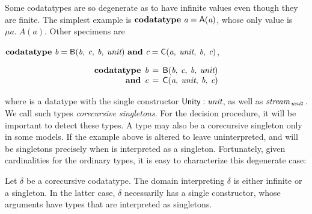 
Some codatatypes are so degenerate as to have infinite values
even though they are finite. The simplest example is
\vthinspace$\textbf{codatatype}~\textit{a} = \textsf{A}(\textit{a})$, whose
only value is $\mu a.\; A(a)$. Other specimens are
\begin{paper}%
\vthinspace$\textbf{codatatype}~\textit{b} = \textsf{B}(\textit{b},\: \textit{c},\: \textit{b},\: \textit{unit})
~\textbf{and}~ \textit{c} = \textsf{C}(\textit{a},\: \textit{unit},\: \textit{b},\: \textit{c})$,
\end{paper}%
\begin{report}%
\[\begin{aligned}[t]
      \textbf{codatatype}\;\, \textit{b} & \,=\, \textsf{B}(\textit{b},\: \textit{c},\: \textit{b},\: \textit{unit}) \\[-1\jot]
      \textbf{and}\;\, \textit{c} & \,=\, \textsf{C}(\textit{a},\: \textit{unit},\: \textit{b},\: \textit{c})
\end{aligned}
\]
\end{report}
where  is a datatype with the single constructor $\textsf{Unity} :
\textit{unit}$, as well as $\textit{stream}_{\,\textit{unit}\,}$. We call such types
\emph{corecursive singletons}. For the decision procedure, it will be
important to detect these types. %
A type may also be a corecursive singleton only in some models. If the example
above is altered to leave  uninterpreted,  and  will be
singletons precisely when  is interpreted as a singleton.
Fortunately, given cardinalities for the ordinary types, it is easy to
characterize this degenerate case:


\begin{lemma}%
\label{lem:corecursive-singletons}%
\afterDot
Let $\delta$ be a corecursive codatatype. The domain interpreting $\delta$ is
either infinite or a singleton. In the latter case, $\delta$ necessarily has a
single constructor, whose arguments have types that are interpreted as
singletons.
\end{lemma}


